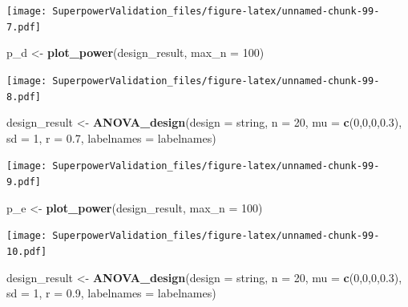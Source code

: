 \documentclass[]{book}
\newenvironment{Shaded}{\begin{snugshade}}{\end{snugshade}}
\newcommand{\DataTypeTok}[1]{\textcolor[rgb]{0.13,0.29,0.53}{#1}}
\newcommand{\DecValTok}[1]{\textcolor[rgb]{0.00,0.00,0.81}{#1}}
\newcommand{\FloatTok}[1]{\textcolor[rgb]{0.00,0.00,0.81}{#1}}
\newcommand{\KeywordTok}[1]{\textcolor[rgb]{0.13,0.29,0.53}{\textbf{#1}}}
\newcommand{\NormalTok}[1]{#1}
\newcommand{\StringTok}[1]{\textcolor[rgb]{0.31,0.60,0.02}{#1}}
\begin{document}
\texttt{[image: SuperpowerValidation\_files/figure-latex/unnamed-chunk-99-7.pdf]}

\begin{Shaded}
\begin{Highlighting}[]
\NormalTok{p_d <-}\StringTok{ }\KeywordTok{plot_power}\NormalTok{(design_result,}
                      \DataTypeTok{max_n =} \DecValTok{100}\NormalTok{)}
\end{Highlighting}
\end{Shaded}

\texttt{[image: SuperpowerValidation\_files/figure-latex/unnamed-chunk-99-8.pdf]}

\begin{Shaded}
\begin{Highlighting}[]
\NormalTok{design_result <-}\StringTok{ }\KeywordTok{ANOVA_design}\NormalTok{(}\DataTypeTok{design =}\NormalTok{ string,}
                              \DataTypeTok{n =} \DecValTok{20}\NormalTok{, }
                              \DataTypeTok{mu =} \KeywordTok{c}\NormalTok{(}\DecValTok{0}\NormalTok{,}\DecValTok{0}\NormalTok{,}\DecValTok{0}\NormalTok{,}\FloatTok{0.3}\NormalTok{), }
                              \DataTypeTok{sd =} \DecValTok{1}\NormalTok{, }
                              \DataTypeTok{r =} \FloatTok{0.7}\NormalTok{, }
                              \DataTypeTok{labelnames =}\NormalTok{ labelnames)}
\end{Highlighting}
\end{Shaded}

\texttt{[image: SuperpowerValidation\_files/figure-latex/unnamed-chunk-99-9.pdf]}

\begin{Shaded}
\begin{Highlighting}[]
\NormalTok{p_e <-}\StringTok{ }\KeywordTok{plot_power}\NormalTok{(design_result,}
                      \DataTypeTok{max_n =} \DecValTok{100}\NormalTok{)}
\end{Highlighting}
\end{Shaded}

\texttt{[image: SuperpowerValidation\_files/figure-latex/unnamed-chunk-99-10.pdf]}

\begin{Shaded}
\begin{Highlighting}[]
\NormalTok{design_result <-}\StringTok{ }\KeywordTok{ANOVA_design}\NormalTok{(}\DataTypeTok{design =}\NormalTok{ string,}
                              \DataTypeTok{n =} \DecValTok{20}\NormalTok{, }
                              \DataTypeTok{mu =} \KeywordTok{c}\NormalTok{(}\DecValTok{0}\NormalTok{,}\DecValTok{0}\NormalTok{,}\DecValTok{0}\NormalTok{,}\FloatTok{0.3}\NormalTok{), }
                              \DataTypeTok{sd =} \DecValTok{1}\NormalTok{, }
                              \DataTypeTok{r =} \FloatTok{0.9}\NormalTok{, }
                              \DataTypeTok{labelnames =}\NormalTok{ labelnames)}
\end{Highlighting}
\end{Shaded}
\end{document}
